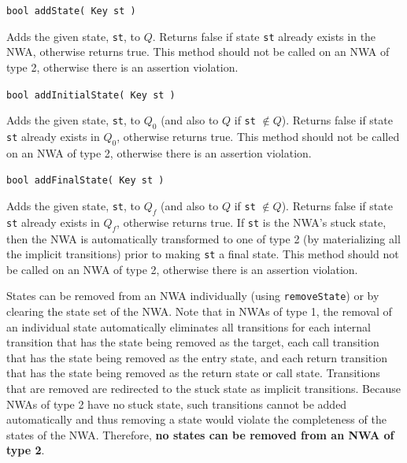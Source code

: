 \documentclass{llncs}
\begin{document}
\begin{description}

  \item\texttt{bool addState( Key st )} \nopagebreak

    Adds the given state, \texttt{st}, to $Q$.  Returns false if state
    \texttt{st} already exists in the NWA, otherwise returns true.  This
    method should not be called on an NWA of type 2, otherwise there is an
    assertion violation.

  \item\texttt{bool addInitialState( Key st )} \nopagebreak

    Adds the given state, \texttt{st}, to $Q_0 $ (and also to $Q$ if
    \texttt{st} $\not\in Q$).  Returns false if state \texttt{st} already
    exists in $Q_0$, otherwise returns true.  This method should not be
    called on an NWA of type 2, otherwise there is an assertion violation.

  \item\texttt{bool addFinalState( Key st )} \nopagebreak

    Adds the given state, \texttt{st}, to $Q_f$ (and also to $Q$ if
    \texttt{st} $\not\in Q$).  Returns false if state \texttt{st} already
    exists in $Q_f$, otherwise returns true.  If \texttt{st} is the NWA's
    stuck state, then the NWA is automatically transformed to one of type 2
    (by materializing all the implicit transitions) prior to making
    \texttt{st} a final state.  This method should not be called on an NWA of
    type 2, otherwise there is an assertion violation. \\

\end{description}


States can be removed from an NWA individually (using \texttt{removeState})
or by clearing the state set of the NWA.  Note that in NWAs of type 1, the
removal of an individual state automatically eliminates all transitions for
each internal transition that has the state being removed as the target, each
call transition that has the state being removed as the entry state, and each
return transition that has the state being removed as the return state or
call state.  Transitions that are removed are redirected to the stuck state
as implicit transitions.  Because NWAs of type 2 have no stuck state, such
transitions cannot be added automatically and thus removing a state would
violate the completeness of the states of the NWA.  Therefore, \textbf{no
  states can be removed from an NWA of type 2}.
\end{document}
